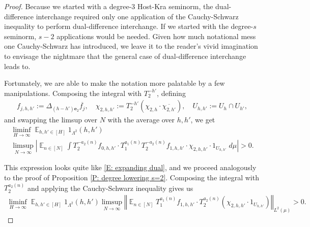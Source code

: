 \documentclass[10pt,a4paper]{amsart}
\DeclareMathOperator*{\E}{\mathbb{E}}
\newcommand{\abs}[1]{\mathopen{}\left| #1\mathclose{}\right|}
\newcommand{\be}{{\mathbf{e}}}
\newcommand{\norm}[1]{\left\Vert #1\right\Vert}
\begin{document}
\begin{proof}
    Because we started with a degree-3 Host-Kra seminorm, the dual-difference interchange required only one application of the Cauchy-Schwarz inequality to perform dual-difference interchange. If we started with the degree-$s$ seminorm, $s-2$ applications would be needed. Given how much notational mess one Cauchy-Schwarz has introduced, we leave it to the reader's vivid imagination to envisage the nightmare that the general case of dual-difference interchange leads to.
    
    Fortunately, we are able to make the notation more palatable by a few manipulations. Composing the integral with $T_2^{-h'}$, defining
    \begin{align*}
        f_{j,h,h'} := \Delta_{(h-h')\be_2}\overline{f_j},\quad \chi_{2,h,h'} := T_2^{-h'}(\chi_{2,h}\cdot\overline{\chi_{2,h'}}),\quad U_{h,h'} := U_h\cap U_{h'},
    \end{align*}
    and swapping the limsup over $N$ with the average over $h,h'$, we get
    \begin{multline*}%
         \liminf_{H\to\infty} \E_{h,h'\in[H]}1_{\Lambda^2}(h,h')\\
         \limsup_{N\to\infty}\abs{\E_{n\in[N]}\int T_2^{-a_2(n)}f_{0,h,h'}\cdot T_1^{a_1(n)}T_2^{-a_2(n)}{f_{1,h,h'}}\cdot \chi_{2,h,h'}\cdot 1_{U_{h,h'}}\; d\mu} > 0.
    \end{multline*}
    
    This expression looks quite like \eqref{E: expanding dual}, and we proceed analogously to the proof of Proposition \ref{P: degree lowering s=2}. Composing the integral with $T_2^{a_2(n)}$ and applying the Cauchy-Schwarz inequality gives us
    \begin{multline*}
        \liminf_{H\to\infty} \E_{h,h'\in[H]}1_{\Lambda^2}(h,h')
         \limsup_{N\to\infty}\norm{\E_{n\in[N]}T_1^{a_1(n)}{f_{1,h,h'}}\cdot T_2^{a_2(n)}(\chi_{2,h,h'}\cdot 1_{U_{h,h'}})}_{L^2(\mu)} > 0.
    \end{multline*}


\end{proof}
\end{document}
